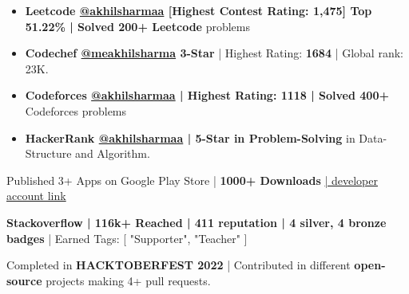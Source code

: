 \documentclass[a4,11pt]{article}
\newenvironment{zitemize}{
\begin{itemize}\itemsep0pt \parskip0pt \parsep1pt}
{\end{itemize}\vspace{-0.5cm}}
\begin{document}
    \begin{zitemize}
        \item \textbf{Leetcode \href{https://leetcode.com/akhilsharmaa/}{@akhilsharmaa} [Highest Contest Rating: 1,475] Top 51.22\% | Solved 200+ Leetcode} problems

         \item \textbf{Codechef \href{https://www.codechef.com/users/meakhilsharma}{@meakhilsharma}  \large{3-Star}} | Highest Rating: \textbf{1684} | Global rank: 23K.

         \item \textbf{Codeforces \href{https://codeforces.com/profile/akhilsharmaa}{@akhilsharmaa} | Highest Rating: 1118 |  Solved 400+} Codeforces problems 

         \item \textbf{HackerRank \href{https://www.hackerrank.com/akhilsharmaa}{@akhilsharmaa} | 5-Star in Problem-Solving} in Data-Structure and Algorithm.

    \end{zitemize}
    \vspace{0.4cm}
    

     Published 3+ Apps on Google Play Store | \textbf{1000+ Downloads} \href{https://play.google.com/store/apps/dev?id=5576110735738802736}{| developer account link}
     \vspace{-0.02cm}

     \textbf{Stackoverflow | 116k+ Reached | 411 reputation | 4 silver, 4 bronze badges }| Earned Tags: [ "Supporter", "Teacher" ]
     \vspace{-0.02cm}

     Completed in \textbf{HACKTOBERFEST 2022} | Contributed in different \textbf{open-source} projects making 4+ pull requests. 
    

    
\end{document}
